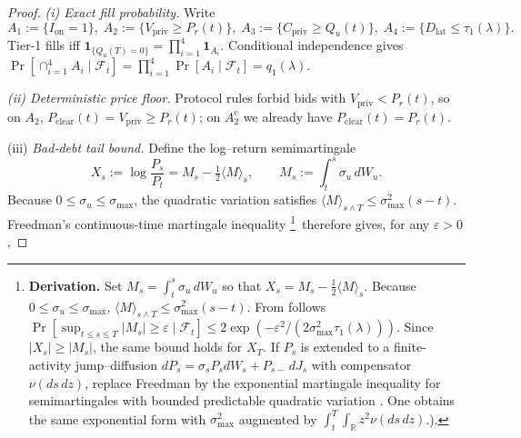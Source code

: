\documentclass[11pt]{article}
\begin{document}
\begin{proof}
\emph{(i) Exact fill probability.}
Write
\(
  A_1:=\{I_{\mathrm{on}}=1\},\;
  A_2:=\{V_{\mathrm{priv}}\ge P_r(t)\},\;
  A_3:=\{C_{\mathrm{priv}}\ge Q_u(t)\},\;
  A_4:=\{D_{\mathrm{lat}}\le\tau_1(\lambda)\}.
\)
Tier-1 fills iff
\(
  \mathbf 1_{\{Q_u(T)=0\}}=\prod_{i=1}^4\mathbf 1_{A_i}.
\)
Conditional independence gives
\(
  \Pr[\cap_{i=1}^4A_i\mid\mathcal F_t]
     =\prod_{i=1}^4\Pr[A_i\mid\mathcal F_t]
     =q_1(\lambda).
\)

\smallskip
\noindent
\emph{(ii) Deterministic price floor.}
Protocol rules forbid bids with
$V_{\mathrm{priv}}<P_r(t)$, so on $A_2$,
$P_{\mathrm{clear}}(t)=V_{\mathrm{priv}}\ge P_r(t)$; on $A_2^{\mathrm c}$
we already have $P_{\mathrm{clear}}(t)=P_r(t)$.

\smallskip
\noindent

\item[(iii)]  \emph{Bad-debt tail bound.}
      Define the log–return semimartingale
      \[
         X_s:=\log\frac{P_s}{P_t}
              =M_s-\tfrac12\langle M\rangle_s,
         \qquad
         M_s:=\int_t^s\sigma_u\,dW_u.
      \]
      Because \(0\le\sigma_u\le\sigma_{\max}\),
      the quadratic variation satisfies
      \(\langle M\rangle_{s\wedge T}
          \le\sigma_{\max}^2(s-t)\).
      Freedman’s continuous-time martingale inequality%
\footnote{%
\textbf{Derivation.}  Set
\(M_s=\int_t^s\sigma_u\,dW_u\)
so that
\(X_s=M_s-\frac12\langle M\rangle_s\).
Because \(0\!\le\!\sigma_u\!\le\!\sigma_{\max}\),
\(\langle M\rangle_{s\wedge T}\le\sigma_{\max}^2(s-t)\).
From \textcite[Th.\,2]{freedman1975tail}
follows
\(
  \Pr[\sup_{t\le s\le T}|M_s|\ge\varepsilon\mid\mathcal F_t]
  \le 2\exp(-\varepsilon^{2}/(2\sigma_{\max}^{2}\tau_1(\lambda))).
\)
Since \(|X_s|\ge|M_s|\), the same bound holds for \(X_T\).
If \(P_s\) is extended to a finite-activity
      jump–diffusion
      \(dP_s=\sigma_s P_s dW_s+P_{s-}\,dJ_s\)
      with compensator
      \(\nu(ds\,dz)\),
      replace Freedman by the exponential martingale inequality for
      semimartingales with bounded predictable quadratic variation
      \parencite[Th.\,8.7]{applebaum2009}.  One obtains the same
      exponential form with
      \(\sigma_{\max}^2\) augmented by
      \(\int_{t}^{T}\!\!\int_{\mathbb R}z^2\nu(ds\,dz)\).).
}\,
therefore gives, for any \(\varepsilon>0\),


\end{proof}
\end{document}

